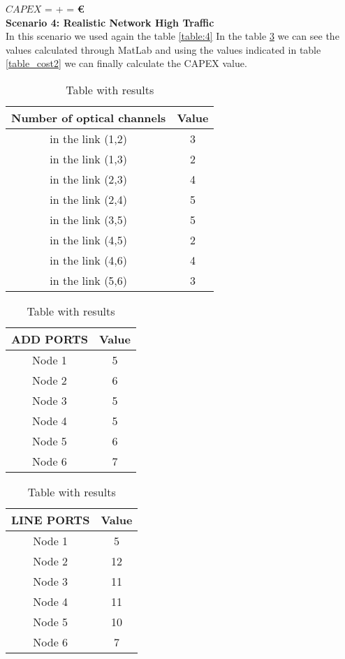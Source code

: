 $CAPEX$ =  +  = \textbf{ \euro}\\


\vspace{11pt}
\textbf{Scenario 4: Realistic Network High Traffic} \label{Scenario4_transp} \\
In this scenario we used again the table \ref{table:4} In the table \ref{result_ILP4_T} we can see the values calculated through MatLab and using the values indicated in table \ref{table_cost2} we can finally calculate the CAPEX value. \\

\begin{table}[h!]
\centering
\begin{tabular}{| c | c |}
 \hline
 Number of optical channels & Value \\
 \hline\hline
 in the link (1,2) & 3 \\
 in the link (1,3) & 2 \\
 in the link (2,3) & 4 \\
 in the link (2,4) & 5 \\
 in the link (3,5) & 5 \\
 in the link (4,5) & 2 \\
 in the link (4,6) & 4 \\
 in the link (5,6) & 3 \\
 \hline
\end{tabular}
\quad
\begin{tabular}{| c | c |}
 \hline
 ADD PORTS & Value \\
 \hline\hline
 Node 1 & 5 \\
 Node 2 & 6 \\
 Node 3 & 5 \\
 Node 4 & 5 \\
 Node 5 & 6 \\
 Node 6 & 7 \\
 \hline
\end{tabular}
\quad
\begin{tabular}{| c | c |}
 \hline
 LINE PORTS & Value \\
 \hline\hline
 Node 1 & 5 \\
 Node 2 & 12 \\
 Node 3 & 11 \\
 Node 4 & 11 \\
 Node 5 & 10 \\
 Node 6 & 7 \\
 \hline
\end{tabular}
\caption{Table with results}
\label{result_ILP4_T}
\end{table}

